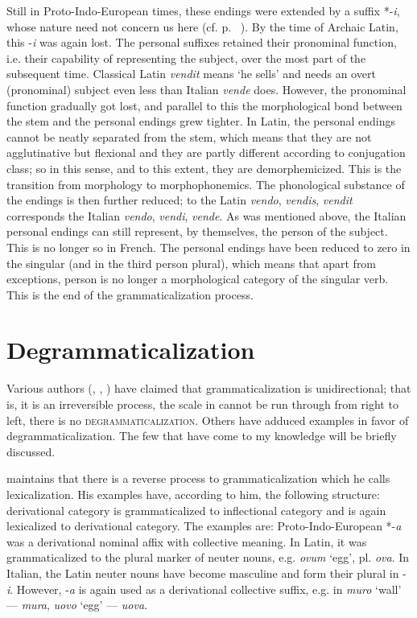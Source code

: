Still in Proto-Indo-European times, these endings were extended by a suffix *-\textit{i}, whose nature need not concern us here (cf. p.~\pageref{page39}%
). By the time of Archaic Latin, this -\textit{i} was again lost. The personal suffixes retained their pronominal function, i.e. their capability of representing the subject, over the most part of the subsequent time. Classical Latin \textit{vendit} means ‘he sells’ and needs an overt (pronominal) subject even less than Italian \textit{vende} does. However, the pronominal function gradually got lost, and parallel to this the morphological bond between the stem and the personal endings grew tighter. In Latin, the personal endings cannot be neatly separated from the stem, which means that they are not agglutinative but flexional and they are partly different according to conjugation class; so in this sense, and to this extent, they are demorphemicized. This is the transition from morphology to morphophonemics. The phonological substance of the endings is then further reduced; to the Latin \textit{vendo}, \textit{vendis},\textit{ vendit} corresponds the Italian \textit{vendo}, \textit{vendi}, \textit{vende}. As was mentioned above, the Italian personal endings can still represent, by themselves, the person of the subject. This is no longer so in French. The personal endings have been reduced to zero in the singular (and in the third person plural), which means that apart from exceptions, person is no longer a morphological category of the singular verb. This is the end of the grammaticalization process.

\section{Degrammaticalization}

Various authors (\citealt[96]{Givón1975}, \citealt[103f]{Langacker1977}, \citealt[56--60]{Vincent1980b}) have claimed that grammaticalization is unidirectional; that is, it is an irreversible process, the scale in  cannot be run through from right to left, there is no \textsc{degrammaticalization}. Others have adduced examples in favor of degrammaticalization. The few that have come to my knowledge will be briefly discussed.

\citet[52f]{Kuryłowicz1965} maintains that there is a reverse process to grammaticalization which he calls lexicalization. His examples have, according to him, the following structure: derivational category is grammaticalized to inflectional category and is again lexicalized to derivational category. The examples are: Proto-Indo-European *-\textit{a} was a derivational nominal affix with collective meaning. In Latin, it was grammaticalized to the plural marker of neuter nouns, e.g. \textit{ovum} ‘egg’, pl. \textit{ova}. In Italian, the Latin neuter nouns have become masculine and form their plural in -\textit{i}. However, -\textit{a} is again used as a derivational collective suffix, e.g. in \textit{muro} ‘wall’ — \textit{mura}, \textit{uovo} ‘egg’ — \textit{uova}.

